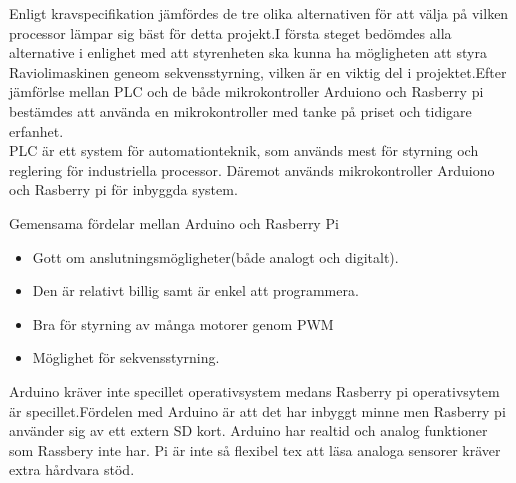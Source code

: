 Enligt kravspecifikation jämfördes de tre olika alternativen för att välja på vilken processor lämpar sig bäst för detta projekt.I första steget bedömdes alla alternative i enlighet med att styrenheten ska kunna ha  mögligheten att styra Raviolimaskinen geneom sekvensstyrning, vilken är en viktig del i projektet.Efter jämförlse mellan PLC och de både mikrokontroller Arduiono och Rasberry pi bestämdes att använda en mikrokontroller med tanke på priset och tidigare erfanhet. \\

PLC är ett system för automationteknik, som används mest för styrning och reglering för industriella processor. Däremot används mikrokontroller Arduiono och Rasberry pi för inbyggda system.

Gemensama fördelar mellan Arduino och Rasberry Pi
\begin{itemize}
	\item Gott om anslutningsmögligheter(både analogt och digitalt).
	\item Den är relativt billig samt är enkel att programmera.
	\item Bra för styrning av många motorer genom PWM
	\item Möglighet för sekvensstyrning.
\end{itemize}

 Arduino kräver inte specillet operativsystem medans Rasberry pi operativsytem är specillet.Fördelen med  Arduino är att det har inbyggt minne men Rasberry pi använder sig av ett extern SD kort. Arduino har realtid och analog funktioner som Rassbery inte har. Pi är inte så flexibel tex att läsa analoga sensorer kräver extra hårdvara stöd.

